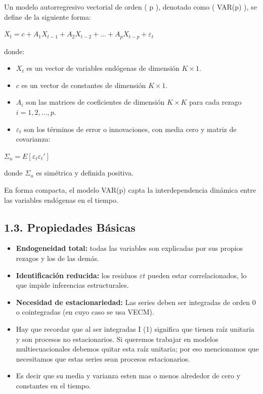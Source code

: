 \documentclass[
  spanish,
  letterpaper,
  DIV=11,
  numbers=noendperiod]{scrartcl}
\providecommand{\tightlist}{%
  \setlength{\itemsep}{0pt}\setlength{\parskip}{0pt}}
\begin{document}
Un modelo autorregresivo vectorial de orden ( p ), denotado como (
VAR(p) ), se define de la siguiente forma:

\(X_t = c + A_1 X_{t-1} + A_2 X_{t-2} + \dots + A_p X_{t-p} + \varepsilon_t\)

donde:

\begin{itemize}
\tightlist
\item
  \(X_t\) es un vector de variables endógenas de dimensión
  \(K \times 1\).
\item
  \(c\) es un vector de constantes de dimensión \(K \times 1\).
\item
  \(A_i\) son las matrices de coeficientes de dimensión \(K \times K\)
  para cada rezago \(i = 1, 2, \dots, p\).
\item
  \(\varepsilon_t\) son los términos de error o innovaciones, con media
  cero y matriz de covarianza:
\end{itemize}

\(\Sigma_u = E[\varepsilon_t \varepsilon_t']\)

donde \(\Sigma_u\) es simétrica y definida positiva.

En forma compacta, el modelo VAR(p) capta la interdependencia dinámica
entre las variables endógenas en el tiempo.

\subsection{1.3. Propiedades Básicas}\label{propiedades-buxe1sicas}

\begin{itemize}
\item
  \textbf{Endogeneidad total:} todas las variables son explicadas por
  sus propios rezagos y los de las demás.
\item
  \textbf{Identificación reducida:} los residuos \(εt\) pueden estar
  correlacionados, lo que impide inferencias estructurales.
\item
  \textbf{Necesidad de estacionariedad:} Las series deben ser integradas
  de orden 0 o cointegradas (en cuyo caso se usa VECM).
\item
  Hay que recordar que al ser integradas I (1) significa que tienen raíz
  unitaria y son procesos no estacionarios. Si queremos trabajar en
  modelos multiecuacionales debemos quitar esta raíz unitaria; por eso
  mencionamos que necesitamos que estas series sean procesos
  estacionarios.
\item
  Es decir que su media y varianza esten mas o menos alrededor de cero y
  constantes en el tiempo.
\end{itemize}
\end{document}
